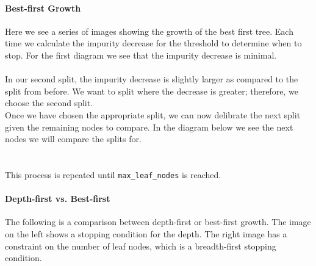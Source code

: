 \documentclass[11pt,a4paper]{report}
\begin{document}
\paragraph{Best-first Growth}Here we see a series of images showing the growth of the best first tree. Each time we calculate the impurity decrease for the threshold to determine when to stop. For the first diagram we see that the impurity decrease is minimal.\\
\\
In our second split, the impurity decrease is slightly larger as compared to the split from before. We want to split where the decrease is greater; therefore, we choose the second split.\\
Once we have chosen the appropriate split, we can now delibrate the next split given the remaining nodes to compare. In the diagram below we see the next nodes we will compare the splits for.\\
\\\\
This process is repeated until \texttt{max\_leaf\_nodes} is reached.
	\paragraph{Depth-first vs. Best-first}The following is a comparison between depth-first or best-first growth. The image on the left shows a stopping condition for the depth. The right image has a constraint on the number of leaf nodes, which is a breadth-first stopping condition.\\
\end{document}
